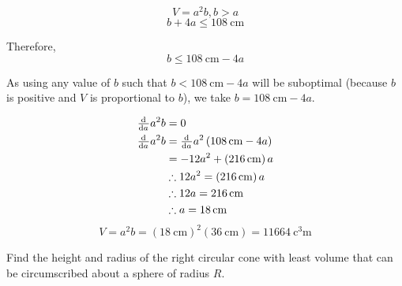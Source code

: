 \documentclass[a4paper, titlepage]{article}
\begin{document}
\begin{Answer}

\[V = a^2 b, b > a\]
\[b + 4a \le \SI{108}{\centi\meter}\]

Therefore,
\[b \le \SI{108}{\centi\meter} - 4a\]

As using any value of \(b\) such that \(b < \SI{108}{\centi\meter} - 4a\)
will be suboptimal (because \(b\) is positive and \(V\) is proportional to \(b\)),
we take \(b = \SI{108}{\centi\meter} - 4a\).

\begin{align*}
  \od{}{a} a^2 b &= 0 \\
  \od{}{a} a^2 b &= \od{}{a} a^2 \left( \SI{108}{\centi\meter} - 4a \right) \\
                 &= -12 a^2 + \left( \SI{216}{\centi\meter} \right) a \\
                 &\therefore 12 a^2 = \left( \SI{216}{\centi\meter} \right) a \\
                 &\therefore 12 a = \SI{216}{\centi\meter} \\
                 &\therefore a = \SI{18}{\centi\meter}
\end{align*}
\[V = a^2 b = \left( \SI{18}{\centi\meter} \right)^2 \left( \SI{36}{\centi\meter} \right)
            = \SI{11664}{\cubic\centi\meter}\]
\end{Answer}

\begin{Exercise}
Find the height and radius of the right circular cone with
least volume that can be circumscribed about a sphere of
radius \(R\).
\cite{anton-bivens-davis}
\end{Exercise}
\end{document}
